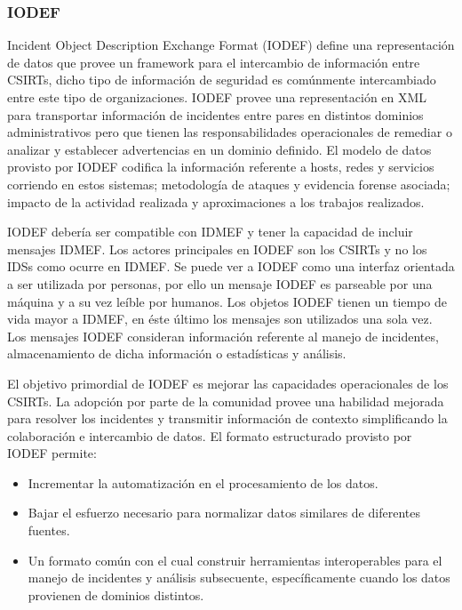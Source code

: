 \subsubsection{IODEF}

Incident Object Description Exchange Format (IODEF) define una representación de datos que provee un framework para el 
intercambio de información entre CSIRTs, dicho tipo de información de seguridad 
es comúnmente intercambiado entre este tipo de organizaciones. IODEF provee una 
representación en XML para transportar información de incidentes entre pares en 
distintos dominios administrativos pero que tienen las responsabilidades 
operacionales de remediar o analizar y establecer advertencias en un dominio 
definido. El modelo de datos provisto por IODEF codifica la información 
referente a hosts, redes y servicios corriendo en estos sistemas; metodología 
de ataques y evidencia forense asociada; impacto de la actividad realizada y
aproximaciones a los trabajos realizados.

IODEF debería ser compatible con IDMEF y tener la capacidad de incluir mensajes 
IDMEF. Los actores principales en IODEF son los CSIRTs y no los IDSs como ocurre 
en IDMEF. Se puede ver a IODEF como una interfaz orientada a ser utilizada por 
personas, por ello un mensaje IODEF es parseable por una máquina y a su vez 
leíble por humanos. Los objetos IODEF tienen un tiempo de vida mayor a IDMEF, 
en éste último los mensajes son utilizados una sola vez. Los mensajes IODEF consideran 
información referente al manejo de incidentes, almacenamiento de dicha 
información o estadísticas y análisis.

El objetivo primordial de IODEF es mejorar las capacidades operacionales de los 
CSIRTs. La adopción por parte de la comunidad provee una habilidad mejorada para 
resolver los incidentes y transmitir información de contexto simplificando la 
colaboración e intercambio de datos.
El formato estructurado provisto por IODEF permite:
\begin{itemize}
  \item Incrementar la automatización en el procesamiento de los datos.
  \item Bajar el esfuerzo necesario para normalizar datos similares de 
  diferentes fuentes.
  \item Un formato común con el cual construir herramientas interoperables para 
  el manejo de incidentes y análisis subsecuente, específicamente cuando 
  los datos provienen de dominios distintos.
\end{itemize}


